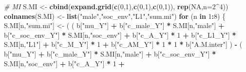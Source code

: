 \documentclass[
]{book}
\newenvironment{Shaded}{\begin{snugshade}}{\end{snugshade}}
\newcommand{\AttributeTok}[1]{\textcolor[rgb]{0.13,0.29,0.53}{#1}}
\newcommand{\CommentTok}[1]{\textcolor[rgb]{0.56,0.35,0.01}{\textit{#1}}}
\newcommand{\ConstantTok}[1]{\textcolor[rgb]{0.56,0.35,0.01}{#1}}
\newcommand{\ControlFlowTok}[1]{\textcolor[rgb]{0.13,0.29,0.53}{\textbf{#1}}}
\newcommand{\DecValTok}[1]{\textcolor[rgb]{0.00,0.00,0.81}{#1}}
\newcommand{\FunctionTok}[1]{\textcolor[rgb]{0.13,0.29,0.53}{\textbf{#1}}}
\newcommand{\NormalTok}[1]{#1}
\newcommand{\OtherTok}[1]{\textcolor[rgb]{0.56,0.35,0.01}{#1}}
\newcommand{\SpecialCharTok}[1]{\textcolor[rgb]{0.81,0.36,0.00}{\textbf{#1}}}
\newcommand{\StringTok}[1]{\textcolor[rgb]{0.31,0.60,0.02}{#1}}
\begin{document}
\begin{Shaded}
\begin{Highlighting}[]
  \CommentTok{\# MI }
\NormalTok{  S.MI }\OtherTok{\textless{}{-}} \FunctionTok{cbind}\NormalTok{(}\FunctionTok{expand.grid}\NormalTok{(}\FunctionTok{c}\NormalTok{(}\DecValTok{0}\NormalTok{,}\DecValTok{1}\NormalTok{),}\FunctionTok{c}\NormalTok{(}\DecValTok{0}\NormalTok{,}\DecValTok{1}\NormalTok{),}\FunctionTok{c}\NormalTok{(}\DecValTok{0}\NormalTok{,}\DecValTok{1}\NormalTok{)), }\FunctionTok{rep}\NormalTok{(}\ConstantTok{NA}\NormalTok{,}\AttributeTok{n=}\DecValTok{2}\SpecialCharTok{\^{}}\DecValTok{4}\NormalTok{))}
  \FunctionTok{colnames}\NormalTok{(S.MI) }\OtherTok{\textless{}{-}} \FunctionTok{list}\NormalTok{(}\StringTok{"male"}\NormalTok{,}\StringTok{"soc\_env"}\NormalTok{,}\StringTok{"L1"}\NormalTok{,}\StringTok{"sum.mi"}\NormalTok{)}
  \ControlFlowTok{for}\NormalTok{ (n }\ControlFlowTok{in} \DecValTok{1}\SpecialCharTok{:}\DecValTok{8}\NormalTok{) \{}
\NormalTok{    S.MI[n,}\StringTok{"sum.mi"}\NormalTok{] }\OtherTok{\textless{}{-}}\NormalTok{ ( ( b[}\StringTok{"mu\_Y"}\NormalTok{] }\SpecialCharTok{+} 
\NormalTok{                              b[}\StringTok{"c\_male\_Y"}\NormalTok{] }\SpecialCharTok{*}\NormalTok{ S.MI[n,}\StringTok{"male"}\NormalTok{] }\SpecialCharTok{+} 
\NormalTok{                              b[}\StringTok{"c\_soc\_env\_Y"}\NormalTok{] }\SpecialCharTok{*}\NormalTok{ S.MI[n,}\StringTok{"soc\_env"}\NormalTok{] }\SpecialCharTok{+} 
\NormalTok{                              b[}\StringTok{"c\_A\_Y"}\NormalTok{] }\SpecialCharTok{*} \DecValTok{1} \SpecialCharTok{+} 
\NormalTok{                              b[}\StringTok{"c\_L1\_Y"}\NormalTok{] }\SpecialCharTok{*}\NormalTok{ S.MI[n,}\StringTok{"L1"}\NormalTok{] }\SpecialCharTok{+}
\NormalTok{                              b[}\StringTok{"c\_M\_Y"}\NormalTok{] }\SpecialCharTok{*} \DecValTok{1} \SpecialCharTok{+}
\NormalTok{                              b[}\StringTok{"c\_AM\_Y"}\NormalTok{] }\SpecialCharTok{*} \DecValTok{1} \SpecialCharTok{*} \DecValTok{1} \SpecialCharTok{*}\NormalTok{ b[}\StringTok{"A.M.inter"}\NormalTok{] ) }\SpecialCharTok{{-}} 
\NormalTok{                            ( b[}\StringTok{"mu\_Y"}\NormalTok{] }\SpecialCharTok{+} 
\NormalTok{                                b[}\StringTok{"c\_male\_Y"}\NormalTok{] }\SpecialCharTok{*}\NormalTok{ S.MI[n,}\StringTok{"male"}\NormalTok{] }\SpecialCharTok{+} 
\NormalTok{                                b[}\StringTok{"c\_soc\_env\_Y"}\NormalTok{] }\SpecialCharTok{*}\NormalTok{ S.MI[n,}\StringTok{"soc\_env"}\NormalTok{] }\SpecialCharTok{+} 
\NormalTok{                                b[}\StringTok{"c\_A\_Y"}\NormalTok{] }\SpecialCharTok{*} \DecValTok{1} \SpecialCharTok{+} 

\end{Highlighting}
\end{Shaded}
\end{document}
